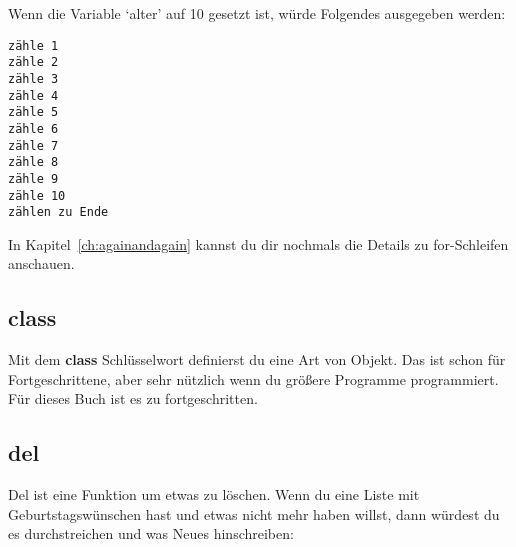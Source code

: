 \noindent
Wenn die Variable `alter' auf 10 gesetzt ist, würde Folgendes ausgegeben werden:

\begin{Verbatim}[frame=single]
zähle 1
zähle 2
zähle 3
zähle 4
zähle 5
zähle 6
zähle 7
zähle 8
zähle 9
zähle 10
zählen zu Ende
\end{Verbatim}

\noindent
In Kapitel~\ref{ch:againandagain} kannst du dir nochmals die Details zu for-Schleifen anschauen.

\subsection*{class}

Mit dem \textbf{class} Schlüsselwort definierst du eine Art von Objekt. Das ist schon für Fortgeschrittene, aber sehr nützlich wenn du größere Programme programmiert. Für dieses Buch ist es zu fortgeschritten.

\subsection*{del}

Del ist eine Funktion um etwas zu löschen. Wenn du eine Liste mit Geburtstagswünschen hast und etwas nicht mehr haben willst, dann würdest du es durchstreichen und was Neues hinschreiben:

